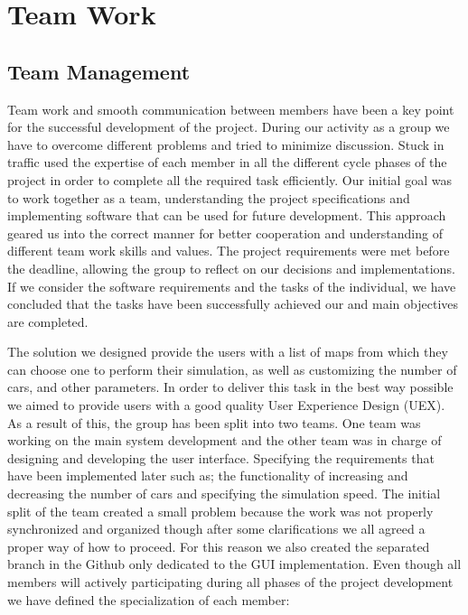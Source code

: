 \documentclass[oneside]{article}
\begin{document}
\section{Team Work}

\subsection{Team Management} Team work and smooth communication between members have been a key point for the successful development of the project. During our activity as a group we have to overcome different problems and tried to minimize discussion. Stuck in traffic used the expertise of each member in all the different cycle phases of the project in order to complete all the required task efficiently. Our initial goal was to work together as a team, understanding the project specifications and implementing software that can be used for future development. This approach geared us into the correct manner for better cooperation and understanding of different team work skills and values. The project requirements were met before the deadline, allowing the group to reflect on our decisions and implementations. If we consider the software requirements and the tasks of the individual, we have concluded that the tasks have been successfully achieved our and main objectives are completed. \newline

\noindent The solution we designed provide the users with a list of maps from which they can choose one to perform their simulation, as well as customizing the number of cars, and other parameters. In order to deliver this task in the best way possible we aimed to provide users with a good quality User Experience Design (UEX). As a result of this, the group has been split into two teams. One team was working on the main system development and the other team was in charge of designing and developing the user interface. Specifying the requirements that have been implemented later such as; the functionality of increasing and decreasing the number of cars and specifying the simulation speed. The initial split of the team created a small problem because the work was not properly synchronized and organized though after some clarifications we all agreed a proper way of how to proceed. For this reason we also created the separated branch in the Github only dedicated to the GUI implementation. Even though all members will actively participating during all phases of the project development we have defined the specialization of each member:
\end{document}
